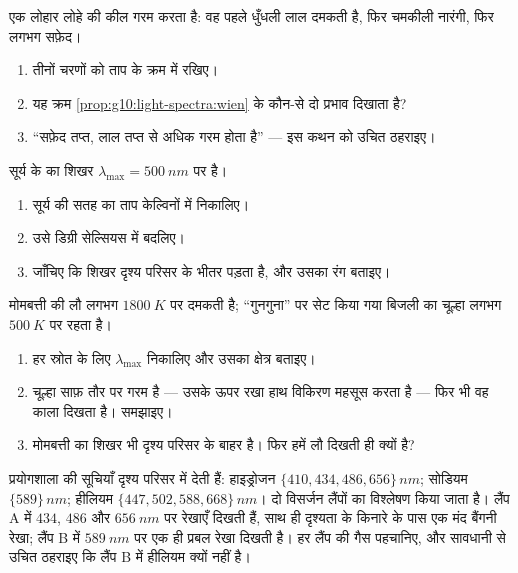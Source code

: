 \begin{exercise}[$\star$]\label{exo:g10:light-spectra:5}
एक लोहार लोहे की कील गरम करता है: वह पहले धुँधली लाल दमकती है, फिर
चमकीली नारंगी, फिर लगभग सफ़ेद।
\begin{enumerate}
  \item तीनों चरणों को ताप के क्रम में रखिए।
  \item यह क्रम \cref{prop:g10:light-spectra:wien} के कौन-से दो प्रभाव दिखाता है?
  \item ``सफ़ेद तप्त, लाल तप्त से अधिक गरम होता है'' --- इस कथन को
        उचित ठहराइए।
\end{enumerate}
\end{exercise}

\begin{exercise}[$\star\star$]\label{exo:g10:light-spectra:6}
सूर्य के  का शिखर $\lambda_{\max} = \qty{500}{nm}$ पर है।
\begin{enumerate}
  \item सूर्य की सतह का ताप केल्विनों में निकालिए।
  \item उसे डिग्री सेल्सियस में बदलिए।
  \item जाँचिए कि शिखर दृश्य परिसर के भीतर पड़ता है, और उसका रंग
        बताइए।
\end{enumerate}
\end{exercise}

\begin{exercise}[$\star\star$]\label{exo:g10:light-spectra:7}
मोमबत्ती की लौ लगभग $\qty{1800}{K}$ पर दमकती है; ``गुनगुना'' पर सेट किया गया
बिजली का चूल्हा लगभग $\qty{500}{K}$ पर रहता है।
\begin{enumerate}
  \item हर स्रोत के लिए $\lambda_{\max}$ निकालिए और उसका क्षेत्र बताइए।
  \item चूल्हा साफ़ तौर पर गरम है --- उसके ऊपर रखा हाथ विकिरण महसूस
        करता है --- फिर भी वह काला दिखता है। समझाइए।
  \item मोमबत्ती का शिखर भी दृश्य परिसर के बाहर है। फिर हमें लौ दिखती
        ही क्यों है?
\end{enumerate}
\end{exercise}

\begin{exercise}[$\star\star$]\label{exo:g10:light-spectra:8}
प्रयोगशाला की सूचियाँ दृश्य परिसर में देती हैं: हाइड्रोजन $\{410, 434, 486, 656\}\,\unit{nm}$;
सोडियम $\{589\}\,\unit{nm}$; हीलियम $\{447, 502, 588, 668\}\,\unit{nm}$। दो विसर्जन लैंपों का विश्लेषण किया
जाता है। लैंप A में $434$, $486$ और $\qty{656}{nm}$ पर रेखाएँ दिखती हैं,
साथ ही दृश्यता के किनारे के पास एक मंद बैंगनी रेखा; लैंप B में $\qty{589}{nm}$
पर एक ही प्रबल रेखा दिखती है। हर लैंप की गैस पहचानिए, और सावधानी से
उचित ठहराइए कि लैंप B में हीलियम क्यों नहीं है।
\end{exercise}

